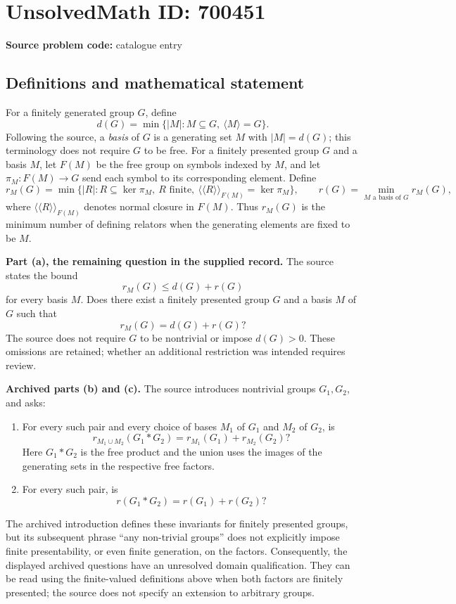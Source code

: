 \documentclass[11pt]{article}
\begin{document}
\section*{UnsolvedMath ID: 700451}
\textbf{Source problem code:} catalogue entry
\subsection{Definitions and mathematical statement}
For a finitely generated group \(G\), define
\[
d(G)=\min\{|M|:M\subseteq G,\ \langle M\rangle=G\}.
\]
Following the source, a \emph{basis} of \(G\) is a generating set \(M\) with \(|M|=d(G)\); this terminology does not require \(G\) to be free. For a finitely presented group \(G\) and a basis \(M\), let \(F(M)\) be the free group on symbols indexed by \(M\), and let \(\pi_M:F(M)\to G\) send each symbol to its corresponding element. Define
\[
r_M(G)=\min\bigl\{|R|:R\subseteq\ker\pi_M,\ R\text{ finite},\ \langle\!\langle R\rangle\!\rangle_{F(M)}=\ker\pi_M\bigr\},
\qquad
r(G)=\min_{M\text{ a basis of }G}r_M(G),
\]
where \(\langle\!\langle R\rangle\!\rangle_{F(M)}\) denotes normal closure in \(F(M)\). Thus \(r_M(G)\) is the minimum number of defining relators when the generating elements are fixed to be \(M\).

\textbf{Part (a), the remaining question in the supplied record.} The source states the bound
\[
r_M(G)\leq d(G)+r(G)
\]
for every basis \(M\). Does there exist a finitely presented group \(G\) and a basis \(M\) of \(G\) such that
\[
r_M(G)=d(G)+r(G)?
\]
The source does not require \(G\) to be nontrivial or impose \(d(G)>0\). These omissions are retained; whether an additional restriction was intended requires review.

\textbf{Archived parts (b) and (c).} The source introduces nontrivial groups \(G_1,G_2\), and asks:
\begin{enumerate}
\item[(b)] For every such pair and every choice of bases \(M_1\) of \(G_1\) and \(M_2\) of \(G_2\), is
\[
r_{M_1\cup M_2}(G_1*G_2)=r_{M_1}(G_1)+r_{M_2}(G_2)?
\]
Here \(G_1*G_2\) is the free product and the union uses the images of the generating sets in the respective free factors.
\item[(c)] For every such pair, is
\[
r(G_1*G_2)=r(G_1)+r(G_2)?
\]
\end{enumerate}
The archived introduction defines these invariants for finitely presented groups, but its subsequent phrase ``any non-trivial groups'' does not explicitly impose finite presentability, or even finite generation, on the factors. Consequently, the displayed archived questions have an unresolved domain qualification. They can be read using the finite-valued definitions above when both factors are finitely presented; the source does not specify an extension to arbitrary groups.
\end{document}
